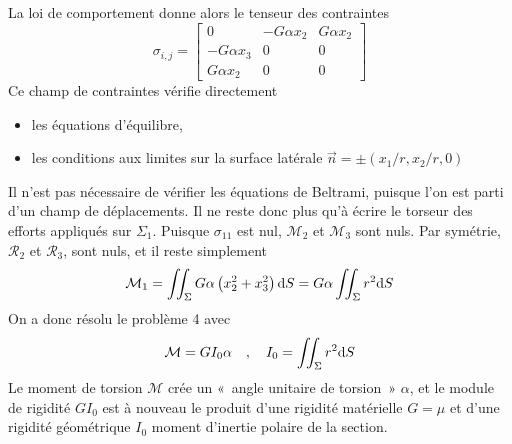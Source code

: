 La loi de comportement donne alors le tenseur des contraintes
\begin{equation}
    \sigma_{i,j} = 
    \begin{bmatrix}
        0 & -G\alpha x_2 & G\alpha x_2 \\
        -G \alpha x_3 & 0 & 0 \\
        G \alpha x_2 & 0 & 0
    \end{bmatrix}
    \label{eq:Ch07-039}
\end{equation}
Ce champ de contraintes vérifie directement
\begin{itemize}
    \item les équations d'équilibre,
    \item les conditions aux limites sur la surface latérale $\vec{n} = \pm \left( x_1/r, x_2/r, 0 \right)$
\end{itemize}
Il n'est pas nécessaire de vérifier les équations de  Beltrami,  puisque l'on est parti d'un champ de déplacements.
Il ne reste donc plus qu'à écrire le torseur des efforts appliqués sur $\Sigma_1$.
Puisque $\sigma_{11}$ est nul, $\mathcal{M}_2$ et $\mathcal{M}_3$ sont nuls.
Par symétrie, $\mathcal{R}_2$ et $\mathcal{R}_3$, sont nuls, et il reste simplement
\begin{equation}
    \mathcal{M}_1 = \iint_{\Sigma} G \alpha \left( x_2^2 + x_3^2 \right) \mathrm{d} S = G\alpha \iint_{\Sigma} r^2 \mathrm{d} S    
    \label{eq:Ch07-040} 
\end{equation}
On a donc résolu le problème 4 avec
\begin{equation}
    \mathcal{M} = G I_0 \alpha \quad,\quad I_0 = \iint_{\Sigma} r^2 \mathrm{d} S
    \label{eq:Ch07-041}
\end{equation}
Le moment de torsion $\mathcal{M}$ crée un «~angle unitaire de torsion~» $\alpha$, et le module de rigidité $G I_0$ est à nouveau le produit d'une rigidité matérielle $G=\mu$ et d'une rigidité géométrique $I_0$ moment d'inertie polaire de la section.

